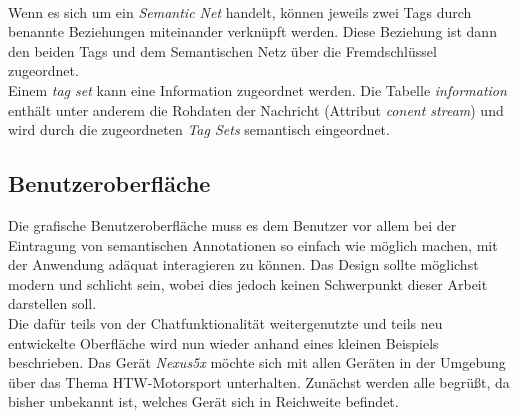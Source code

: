 \\Wenn es sich um ein \textit{Semantic Net} handelt, können jeweils zwei Tags durch benannte Beziehungen miteinander verknüpft werden. Diese Beziehung ist dann den beiden Tags und dem Semantischen Netz über die Fremdschlüssel zugeordnet. 
\\Einem \textit{tag set} kann eine Information zugeordnet werden. Die Tabelle \textit{information} enthält unter anderem die Rohdaten der Nachricht (Attribut \textit{conent stream}) und wird durch die zugeordneten \textit{Tag Sets} semantisch eingeordnet. 
\newpage

\subsection{Benutzeroberfläche}
Die grafische Benutzeroberfläche muss es dem Benutzer vor allem bei der Eintragung von semantischen Annotationen so einfach wie möglich machen, mit der Anwendung adäquat interagieren zu können. Das Design sollte möglichst modern und schlicht sein, wobei dies jedoch keinen Schwerpunkt dieser Arbeit darstellen soll. 
\\Die dafür teils von der Chatfunktionalität weitergenutzte und teils neu entwickelte Ober\-flä\-che wird nun wieder anhand eines kleinen Beispiels beschrieben. Das Gerät \textit{Nexus5x} möchte sich mit allen Geräten in der Umgebung über das Thema HTW-Motorsport unterhalten. Zunächst werden alle begrüßt, da bisher unbekannt ist, welches Gerät sich in Reichweite befindet.\newline\newline
\hspace*{0cm}
